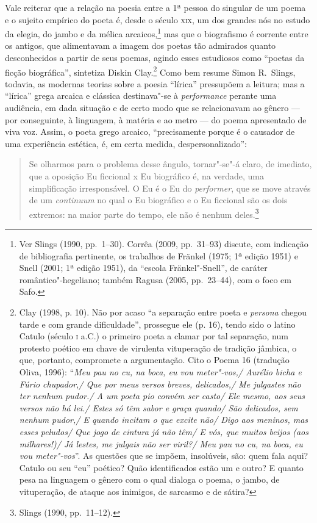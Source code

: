 Vale reiterar que a relação na poesia entre a 1ª pessoa do
singular de um poema e o sujeito empírico do poeta é, desde o século \textsc{xix}, um
dos grandes nós no estudo da elegia, do jambo e da mélica arcaicos,\footnote{
Ver Slings (1990, pp.~1--30). Corrêa (2009, pp.~31--93) discute, com indicação de
bibliografia pertinente, os trabalhos de Fränkel (1975; 1ª edição
1951) e Snell (2001; 1ª edição 1951), da “escola Fränkel"-Snell”, de
caráter romântico"-hegeliano; também Ragusa (2005, pp.~23--44), com o foco em
Safo.} mas que o biografismo é corrente entre os antigos, que alimentavam a
imagem dos poetas tão admirados quanto desconhecidos a partir de seus poemas,
agindo esses estudiosos como “poetas da ficção biográfica”, sintetiza Diskin
Clay.\footnote{ Clay (1998, p. 10). Não por acaso “a separação entre poeta e
\textit{persona} chegou tarde e com grande dificuldade”, prossegue ele (p. 16),
tendo sido o latino Catulo (século \textsc{i} a.C.) o primeiro poeta a clamar por tal
separação, num protesto poético em chave de virulenta vituperação de tradição
jâmbica, o que, portanto, compromete a argumentação. Cito o Poema 16 (tradução
Oliva, 1996): ``\textit{Meu pau no cu, na boca, eu vou meter"-vos,/ Aurélio bicha
e Fúrio chupador,/ Que por meus versos breves, delicados,/ Me julgastes não
ter nenhum pudor./ A um poeta pio convém ser casto/ Ele mesmo, aos seus
versos não há lei./ Estes só têm sabor e graça quando/ São delicados, sem
nenhum pudor,/ E quando incitam o que excite não/ Digo aos meninos, mas esses
peludos/ Que jogo de cintura já não têm/ E vós, que muitos beijos (aos
milhares!)/ Já lestes, me julgais não ser viril?/ Meu pau no cu, na boca, eu
vou meter"-vos}''. As questões que se impõem, insolúveis, são: quem fala
aqui? Catulo ou seu “eu” poético? Quão identificados estão um e outro? E quanto
pesa na linguagem o gênero com o qual dialoga o poema, o jambo, de vituperação,
de ataque aos inimigos, de sarcasmo e de sátira?} Como bem resume Simon R.~Slings, 
todavia, as modernas teorias sobre a poesia “lírica”
pressupõem a leitura; mas a “lírica” grega arcaica e clássica destinava"-se à
\textit{performance} perante uma audiência, em dada situação e de certo modo
que se relacionavam ao gênero --- por conseguinte, à linguagem, à matéria e ao
metro --- do poema apresentado de viva voz. Assim, o poeta grego arcaico,
“precisamente porque é o causador de uma experiência estética, é, em certa
medida, despersonalizado”:

\begin{quote}
Se olharmos para o problema desse ângulo, tornar"-se"-á claro, de imediato, que
a oposição Eu ficcional x Eu biográfico é, na verdade, uma simplificação
irresponsável. O Eu é o Eu do \textit{performer}, que se move através de um
\textit{continuum} no qual o Eu biográfico e o Eu ficcional são os dois
extremos: na maior parte do tempo, ele não é nenhum deles.\footnote{ Slings (1990, pp.~11--12).}
\end{quote}


